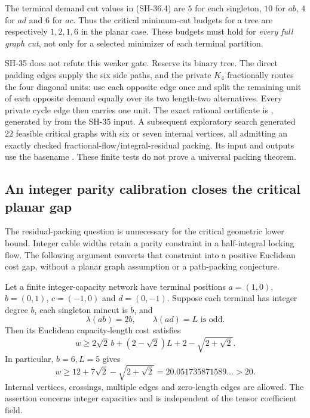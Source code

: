 The terminal demand cut values in (SH-36.4) are $5$ for
each singleton, $10$ for $ab$, $4$ for $ad$ and $6$ for
$ac$.  Thus the critical minimum-cut budgets for a tree
are respectively $1,2,1,6$ in the planar case.  These
budgets must hold for \emph{every full graph cut}, not
only for a selected minimizer of each terminal partition.

SH-35 does not refute this weaker gate.  Reserve its binary
tree.  The direct padding edges supply the six side paths,
and the private $K_4$ fractionally routes the four diagonal
units: use each opposite edge once and split the remaining
unit of each opposite demand equally over its two
length-two alternatives.  Every private cycle edge then
carries one unit.  The exact rational certificate is
,
generated by 
from the SH-35 input.  A subsequent exploratory search
generated $22$ feasible critical graphs with six or seven
internal vertices, all admitting an exactly checked
fractional-flow/integral-residual packing.  Its input and
outputs use the basename .
These finite tests do not prove a universal packing theorem.

\subsection{An integer parity calibration closes the critical planar gap}

The residual-packing question is unnecessary for the critical
geometric lower bound.  Integer cable widths retain a parity
constraint in a half-integral locking flow.  The following
argument converts that constraint into a positive Euclidean
cost gap, without a planar graph assumption or a path-packing
conjecture.

\begin{theorem}
\label{thm:critical-parity-calibration}
Let a finite integer-capacity network have terminal positions
$a=(1,0)$, $b=(0,1)$, $c=(-1,0)$ and $d=(0,-1)$.
Suppose each terminal has integer degree $b$, each singleton
mincut is $b$, and
\[
 \lambda(ab)=2b,\qquad \lambda(ad)=L\text{ is odd}.
                                                        \tag{SH-37.1}
\]
Then its Euclidean capacity-length cost satisfies
\[
 w\ge2\sqrt2\,b+(2-\sqrt2)L+2-\sqrt{2+\sqrt2}.
                                                        \tag{SH-37.G}
\]
In particular, $b=6,L=5$ gives
\[
 w\ge12+7\sqrt2-\sqrt{2+\sqrt2}
   =20.051735871589\ldots>20.                         \tag{SH-37.2}
\]
Internal vertices, crossings, multiple edges and zero-length
edges are allowed.  The assertion concerns integer capacities
and is independent of the tensor coefficient field.
\end{theorem}


